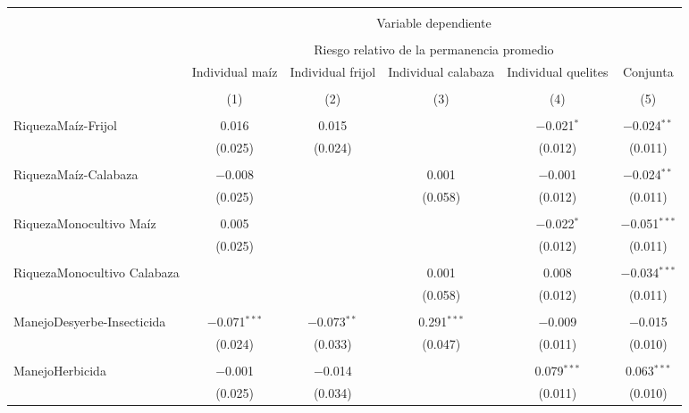 \documentclass[spanish,11pt]{article}
\begin{document}
\begin{table}[!htbp] \centering 
\begin{tabular}{@{\extracolsep{5pt}}lccccc} 
\\[-1.8ex]\hline 
\hline \\[-1.8ex] 
 & \multicolumn{5}{c}{Variable dependiente} \\ 
\cline{2-6} 
\\[-1.8ex] & \multicolumn{5}{c}{Riesgo relativo de la permanencia promedio} \\ 
 & Individual maíz & Individual frijol & Individual calabaza & Individual quelites & Conjunta \\ 
\\[-1.8ex] & (1) & (2) & (3) & (4) & (5)\\ 
\hline \\[-1.8ex] 
 RiquezaMaíz-Frijol & 0.016 & 0.015 &  & $-$0.021$^{*}$ & $-$0.024$^{**}$ \\ 
  & (0.025) & (0.024) &  & (0.012) & (0.011) \\ 
  & & & & & \\ 
 RiquezaMaíz-Calabaza & $-$0.008 &  & 0.001 & $-$0.001 & $-$0.024$^{**}$ \\ 
  & (0.025) &  & (0.058) & (0.012) & (0.011) \\ 
  & & & & & \\ 
 RiquezaMonocultivo Maíz & 0.005 &  &  & $-$0.022$^{*}$ & $-$0.051$^{***}$ \\ 
  & (0.025) &  &  & (0.012) & (0.011) \\ 
  & & & & & \\ 
 RiquezaMonocultivo Calabaza &  &  & 0.001 & 0.008 & $-$0.034$^{***}$ \\ 
  &  &  & (0.058) & (0.012) & (0.011) \\ 
  & & & & & \\ 
 ManejoDesyerbe-Insecticida & $-$0.071$^{***}$ & $-$0.073$^{**}$ & 0.291$^{***}$ & $-$0.009 & $-$0.015 \\ 
  & (0.024) & (0.033) & (0.047) & (0.011) & (0.010) \\ 
  & & & & & \\ 
 ManejoHerbicida & $-$0.001 & $-$0.014 &  & 0.079$^{***}$ & 0.063$^{***}$ \\ 
  & (0.025) & (0.034) &  & (0.011) & (0.010) \\ 

\end{tabular}
\end{table}
\end{document}
